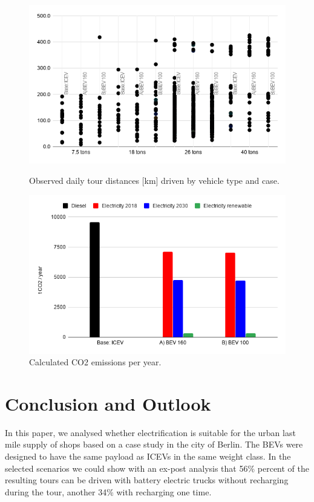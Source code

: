 \begin{figure}
	\centering
	\begin{minipage}{.5\textwidth}
		\centering
		\includegraphics[width=\textwidth]{elektrifizierung/ersetzung1zu1/figs/tourDistances_total_160-100.png}
		\caption{Observed daily tour distances [km] driven by vehicle type and case.}%
		\label{fig:tourDistances}
	\end{minipage}%
	\begin{minipage}{.5\textwidth}
		\centering
		\includegraphics[width=\textwidth]{elektrifizierung/ersetzung1zu1/figs//CO2-Emissions.png}
		\caption{Calculated CO2 emissions per year.}%
		\label{fig:CO2Emssions}
	\end{minipage}
\end{figure}


\section{Conclusion and Outlook}
\label{sec:conclusion}
In this paper, we analysed whether electrification is suitable for the urban last mile supply of shops based on a case study in the city of Berlin. The BEVs were designed to have the same payload as ICEVs in the same weight class.
In the selected scenarios we could show with an ex-post analysis that 56\% percent of the resulting tours can be driven with battery electric trucks without recharging during the tour, another 34\% with recharging one time.

